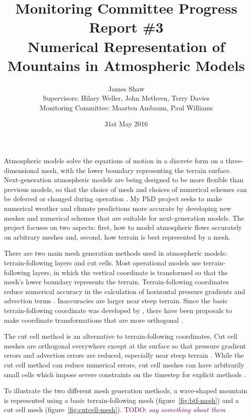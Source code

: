 \documentclass[a4paper,11pt]{article}
\title{Monitoring Committee Progress Report \#3\\
\vspace*{1em}
\Large{Numerical Representation of Mountains in Atmospheric Models}}
\author{James Shaw
\vspace{0.5em} \\
\large{Supervisors: Hilary Weller, John Methven, Terry Davies}
\vspace{0.5em} \\
\large{Monitoring Committee: Maarten Ambaum, Paul Williams}}
\date{31st May 2016}
\newcommand{\TODO}[1]{\textcolor{purple}{TODO: \emph{#1}}}
\begin{document}
\newcommand{\exner}{\Pi}
\maketitle

Atmospheric models solve the equations of motion in a discrete form on a three-dimensional mesh, with the lower boundary representing the terrain surface.
Next-generation atmospheric models are being designed to be more flexible than previous models, so that the choice of mesh and choices of numerical schemes can be deferred or changed during operation \citep{ford2013,theurich2015}.
My PhD project seeks to make numerical weather and climate predictions more accurate by developing new meshes and numerical schemes that are suitable for next-generation models.
The project focuses on two aspects: first, how to model atmospheric flows accurately on arbitrary meshes and, second, how terrain is best represented by a mesh.


There are two main mesh generation methods used in atmospheric models: terrain-following layers and cut cells.
Most operational models use terrain-following layers, in which the vertical coordinate is transformed so that the mesh's lower boundary represents the terrain.
Terrain-following coordinates reduce numerical accuracy in the calculation of horizontal pressure gradients \citep{gary1973,zaengl2012} and advection terms \citep{schaer2002}.  Inaccuracies are larger near steep terrain.  Since the basic terrain-following coordinate was developed by \citet{galchen-somerville1975a}, there have been proposals to make coordinate transformations that are more orthogonal \citep{simmons-burridge1981,schaer2002,leuenberger2010,klemp2011}.

The cut cell method is an alternative to terrain-following coordinates.  Cut cell meshes are orthogonal everywhere except at the surface so that pressure gradient errors and advection errors are reduced, especially near steep terrain \citep{lock2012,good2014}.  While the cut cell method can reduce numerical errors, cut cell meshes can have arbitrarily small cells which impose severe constraints on the timestep for explicit methods \citep{almgren1997}.

To illustrate the two different mesh generation methods, a wave-shaped mountain is represented using a basic terrain-following mesh (figure~\ref{fig:btf-mesh}) and a cut cell mesh (figure~\ref{fig:cutcell-mesh}).  \TODO{say something about them}
\end{document}
